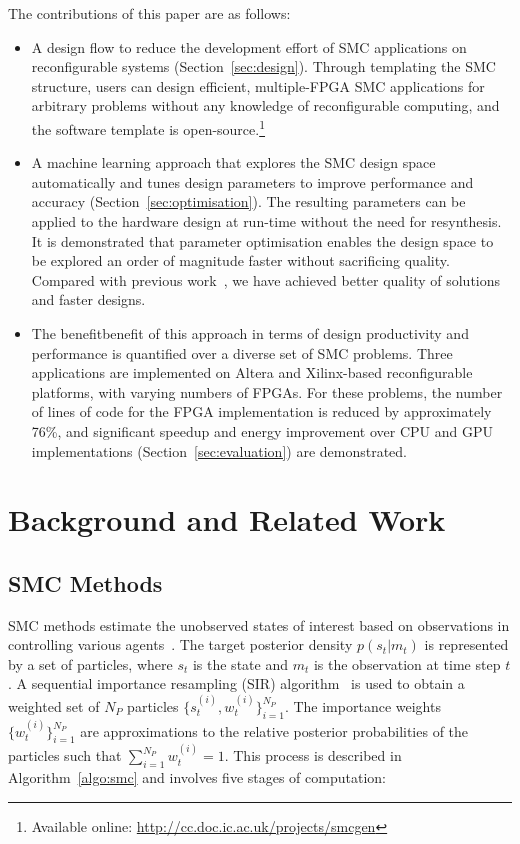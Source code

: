 The contributions of this paper are as follows:
\begin{itemize}
\item A design flow to reduce the development effort of SMC applications on reconfigurable systems (Section~\ref{sec:design}). Through templating the SMC structure, users can design efficient, multiple-FPGA SMC applications for arbitrary problems without any knowledge of reconfigurable computing, and the software template is open-source.\footnote{Available online: \url{http://cc.doc.ic.ac.uk/projects/smcgen}}
\item A machine learning approach that explores the SMC design space automatically and tunes design parameters to improve performance and accuracy (Section~\ref{sec:optimisation}). The resulting parameters can be applied to the hardware design at run-time without the need for resynthesis.
It is demonstrated that parameter optimisation enables the design space to be explored an order of magnitude faster without sacrificing quality.
Compared with previous work~\cite{chau13a,chau13b}, we have achieved better quality of solutions and faster designs.
\item The benefitbenefit  of this approach in terms of design productivity and performance is quantified over a diverse set of SMC problems.
Three applications are implemented on Altera and Xilinx-based reconfigurable platforms, with varying numbers of FPGAs. For these problems, the number of lines of code for the FPGA implementation is reduced by approximately 76\%, and 
significant speedup and energy improvement over CPU and GPU implementations (Section~\ref{sec:evaluation}) are demonstrated.
\end{itemize}


\section{Background and Related Work}
\label{sec:bg}

\subsection{SMC Methods}
\label{sec:smc}

SMC methods estimate the unobserved states of interest based on observations in controlling various agents~\cite{doucet01}.
The target posterior density $p(s_t|m_t)$ is represented by a set of particles, where $s_t$ is the state and $m_t$ is the observation at time step $t$.
A sequential importance resampling (SIR) algorithm~\cite{gordon93} is used to obtain a weighted set of $N_P$ particles $\{s_t^{(i)},w_t^{(i)}\}^{N_P}_{i=1}$.
The importance weights $\{w_t^{(i)}\}^{N_P}_{i=1}$ are approximations to the relative posterior probabilities of the particles such that $\sum^{N_P}_{i=1}w^{(i)}_t = 1$.
This process is described in Algorithm~\ref{algo:smc} and involves five stages of computation:

